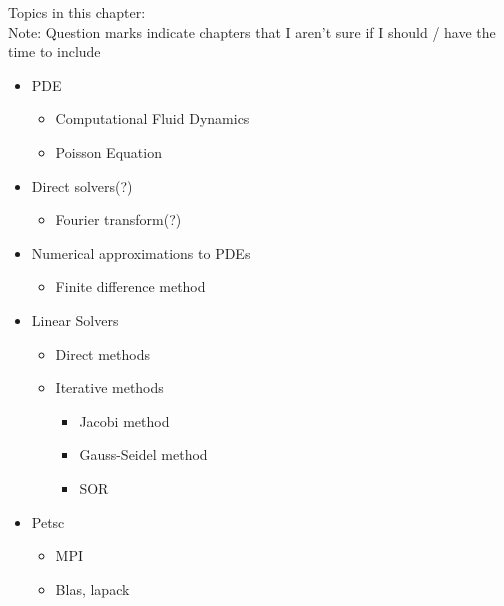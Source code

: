 Topics in this chapter:\\
Note: Question marks indicate chapters that I aren't sure if I should / have the time to include
\begin{itemize}
	\item PDE
	\begin{itemize}
		\item Computational Fluid Dynamics
		\item Poisson Equation
	\end{itemize}
	\item Direct solvers(?)
	\begin{itemize}
		\item Fourier transform(?)
	\end{itemize}
	\item Numerical approximations to PDEs
	\begin{itemize}	
		\item Finite difference method
	\end{itemize}
	\item Linear Solvers
	\begin{itemize}
		\item Direct methods
		\item Iterative methods
		\begin{itemize}
			\item Jacobi method
			\item Gauss-Seidel method
			\item SOR
		\end{itemize}
	\end{itemize}
	\item Petsc
	\begin{itemize}
		\item MPI
		\item Blas, lapack
	\end{itemize}
\end{itemize}
